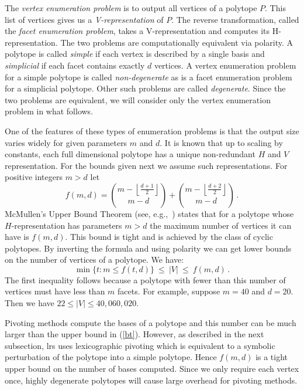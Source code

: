 \documentclass[a4paper,11pt]{article}   \usepackage{authblk} \usepackage[top=1.9cm,bottom=1.9cm,left=1.9cm,right=1.9cm]{geometry}
\newcommand{\progname}{\textsf}
\newcommand{\lrs}{\progname{lrs}\xspace}
\begin{document}
The \emph{vertex enumeration problem} is to output all vertices of a
polytope $P$. This list of vertices gives us a \emph{V-representation} of
$P$. The reverse transformation, called the \emph{facet enumeration problem},
takes a V-representation and computes its
H-representation. The two problems are computationally equivalent via polarity.
A polytope is called {\em simple} if each vertex is described by a single basis
and {\em simplicial} if each facet contains exactly $d$ vertices.
A vertex enumeration problem for a simple polytope is called {\em non-degenerate}
as is a facet enumeration problem for a simplicial polytope. Other
such problems are called {\em degenerate}.
Since the two problems are equivalent, we will consider only the vertex enumeration
problem in what follows.

One of the features of these types of enumeration problems is that the output
size varies widely for given
parameters $m$ and $d$. 
It is known that up to scaling by constants, each full dimensional polytope
has a unique  non-redundant $H$ and $V$ representation.
For the bounds given next we assume such representations.
For positive integers $m>d$ let
\def\lf{\left\lfloor}
\def\rf{\right\rfloor}
\begin{equation}
f(m,d)= \binom{m- \lf \frac{d+1}{2} \rf }{m-d}+ \binom{m- \lf \frac{d+2}{2} \rf }{m-d}\,.
\label{ubt}
\end{equation}
McMullen's Upper Bound Theorem (see, e.g.,~\cite{Ziegler})
states that for a polytope whose $H$-representation has parameters $m>d$ 
the maximum number of vertices it can have is $f(m,d)$. This bound is tight
and is achieved by the class of cyclic polytopes.
By inverting the formula and using polarity we can get lower bounds on the number of vertices of a polytope.
We have:
\begin{equation}
\min \{t: m \le f(t,d) \} ~\le ~|V| ~\le ~f(m,d)\,.
\label{bt}
\end{equation}
The first inequality follows because a polytope with fewer than this number of vertices must have less than $m$ facets.
For example, suppose $m=40$ and $d=20$. Then we have $22 \le |V| \le 40,060,020$. 

Pivoting methods compute the bases of a polytope and this number can be much larger than the upper bound in (\ref{bt}). 
However, as described in the next subsection, \lrs uses lexicographic pivoting which is equivalent to a symbolic perturbation
of the polytope into a simple polytope. Hence $f(m,d)$ is a tight upper bound on the number of
bases computed. Since we only require each vertex once, highly degenerate polytopes will
cause large overhead for pivoting methods. 
\end{document}
